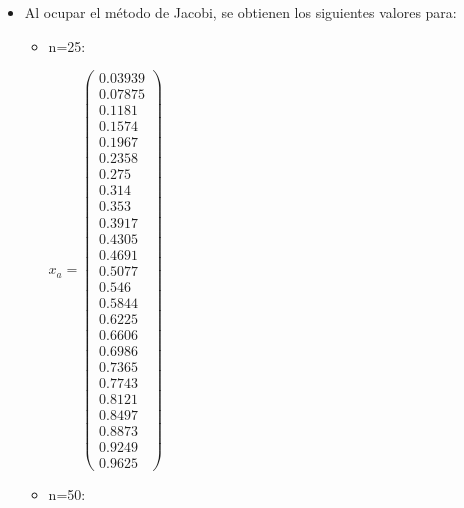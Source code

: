 \documentclass{udpreport}
\begin{document}
\begin{enumerate}
\begin{enumerate}
\begin{itemize}
				\item Al ocupar el método de Jacobi, se obtienen los siguientes valores para:
				\begin{itemize}
					\item n=25: 
					
					$x_{a} = \left(\begin{array}{c} 0.03939\\ 0.07875\\ 0.1181\\ 0.1574\\ 0.1967\\ 0.2358\\ 0.275\\ 0.314\\ 0.353\\ 0.3917\\ 0.4305\\ 0.4691\\ 0.5077\\ 0.546\\ 0.5844\\ 0.6225\\ 0.6606\\ 0.6986\\ 0.7365\\ 0.7743\\ 0.8121\\ 0.8497\\ 0.8873\\ 0.9249\\ 0.9625 \end{array}\right) $
					
					
					\item n=50:
					

\end{itemize}
\end{itemize}
\end{enumerate}
\end{enumerate}
\end{document}
